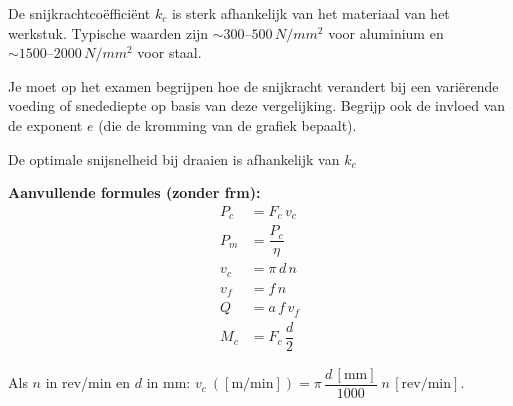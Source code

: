 \documentclass[a4paper,12pt,twoside]{report}
\begin{document}
De snijkrachtcoëfficiënt $k_c$ is sterk afhankelijk van het materiaal van het werkstuk. Typische waarden zijn $\sim 300\text{--}500\,\si{N/mm^2}$ voor aluminium en $\sim 1500\text{--}2000\,\si{N/mm^2}$ voor staal.

\begin{examenbox}
    Je moet op het examen begrijpen hoe de snijkracht verandert bij een variërende voeding of snedediepte op basis van deze vergelijking. Begrijp ook de invloed van de exponent $e$ (die de kromming van de grafiek bepaalt).
\end{examenbox}



De optimale snijsnelheid bij draaien is afhankelijk van $k_c$


\textbf{Aanvullende formules (zonder frm):}
\[
	\begin{aligned}
		P_c & = F_c\,v_c          \\
		P_m & = \dfrac{P_c}{\eta} \\
		v_c & = \pi\,d\,n         \\
		v_f & = f\,n              \\
		Q   & = a\,f\,v_f         \\
		M_c & = F_c\,\dfrac{d}{2}
	\end{aligned}
\]

Als $n$ in rev/min en $d$ in mm: $v_c\ ([\mathrm{m/min}]) = \pi\,\dfrac{d\,[\mathrm{mm}]}{1000}\;n\,[\mathrm{rev/min}]$.
\end{document}
